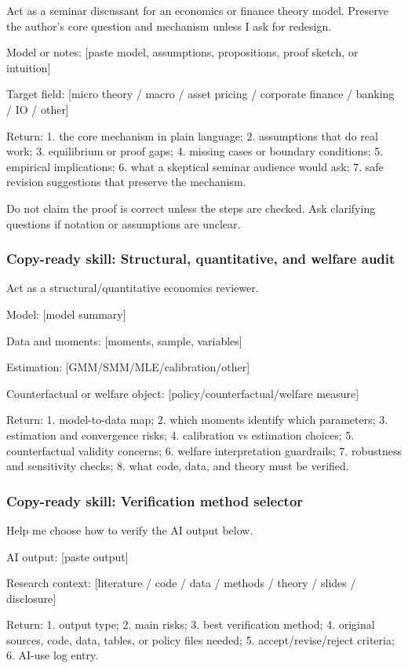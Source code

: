 \documentclass[11pt]{article}
\newcommand{\skill}[1]{\subsubsection*{Copy-ready skill: #1}}
\begin{document}
\begin{promptblock}
Act as a seminar discussant for an economics or finance theory model. Preserve the
author's core question and mechanism unless I ask for redesign.

Model or notes:
[paste model, assumptions, propositions, proof sketch, or intuition]

Target field:
[micro theory / macro / asset pricing / corporate finance / banking / IO / other]

Return:
1. the core mechanism in plain language;
2. assumptions that do real work;
3. equilibrium or proof gaps;
4. missing cases or boundary conditions;
5. empirical implications;
6. what a skeptical seminar audience would ask;
7. safe revision suggestions that preserve the mechanism.

Do not claim the proof is correct unless the steps are checked. Ask clarifying
questions if notation or assumptions are unclear.
\end{promptblock}

\skill{Structural, quantitative, and welfare audit}

\begin{promptblock}
Act as a structural/quantitative economics reviewer.

Model:
[model summary]

Data and moments:
[moments, sample, variables]

Estimation:
[GMM/SMM/MLE/calibration/other]

Counterfactual or welfare object:
[policy/counterfactual/welfare measure]

Return:
1. model-to-data map;
2. which moments identify which parameters;
3. estimation and convergence risks;
4. calibration vs estimation choices;
5. counterfactual validity concerns;
6. welfare interpretation guardrails;
7. robustness and sensitivity checks;
8. what code, data, and theory must be verified.
\end{promptblock}

\skill{Verification method selector}

\begin{promptblock}
Help me choose how to verify the AI output below.

AI output:
[paste output]

Research context:
[literature / code / data / methods / theory / slides / disclosure]

Return:
1. output type;
2. main risks;
3. best verification method;
4. original sources, code, data, tables, or policy files needed;
5. accept/revise/reject criteria;
6. AI-use log entry.
\end{promptblock}
\end{document}

